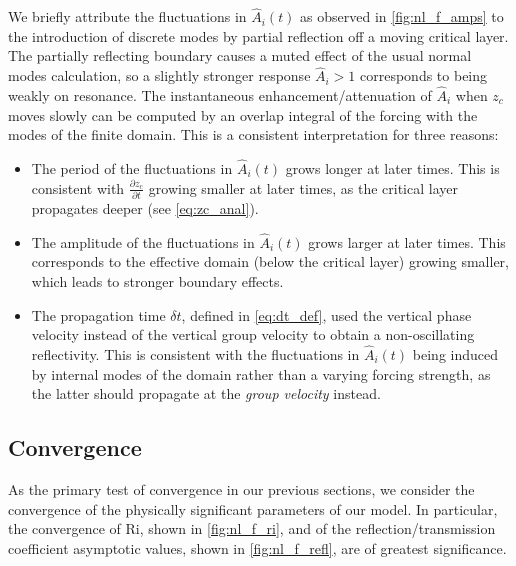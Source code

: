 \documentclass[
        fleqn,
        usenatbib,
    ]{mnras}
\newcommand*{\pd}[2]{\frac{\partial#1}{\partial#2}}
\begin{document}
We briefly attribute the fluctuations in $\hat{A}_i(t)$ as observed in
\autoref{fig:nl_f_amps} to the introduction of discrete modes by partial
reflection off a moving critical layer. The partially reflecting boundary causes
a muted effect of the usual normal modes calculation, so a slightly stronger
response $\hat{A}_i > 1$ corresponds to being weakly on resonance. The
instantaneous enhancement/attenuation of $\hat{A}_i$ when $z_c$ moves slowly can
be computed by an overlap integral of the forcing with the modes of the finite
domain. This is a consistent interpretation for three reasons:
\begin{itemize}
    \item The period of the fluctuations in $\hat{A}_i(t)$ grows longer at later
        times. This is consistent with $\pd{z_c}{t}$ growing smaller at later
        times, as the critical layer propagates deeper (see
        \autoref{eq:zc_anal}).

    \item The amplitude of the fluctuations in $\hat{A}_i(t)$ grows larger at
        later times. This corresponds to the effective domain (below the
        critical layer) growing smaller, which leads to stronger boundary
        effects.

    \item The propagation time $\delta t$, defined in \autoref{eq:dt_def}, used
        the vertical phase velocity instead of the vertical group velocity to
        obtain a non-oscillating reflectivity. This is consistent with the
        fluctuations in $\hat{A}_i(t)$ being induced by internal modes of the
        domain rather than a varying forcing strength, as the latter should
        propagate at the \emph{group velocity} instead.
\end{itemize}

\subsection{Convergence}\label{ss:convergence}

As the primary test of convergence in our previous sections, we consider the
convergence of the physically significant parameters of our model. In
particular, the convergence of $\mathrm{Ri}$, shown in \autoref{fig:nl_f_ri},
and of the reflection/transmission coefficient asymptotic values, shown in
\autoref{fig:nl_f_refl}, are of greatest significance.
\end{document}

